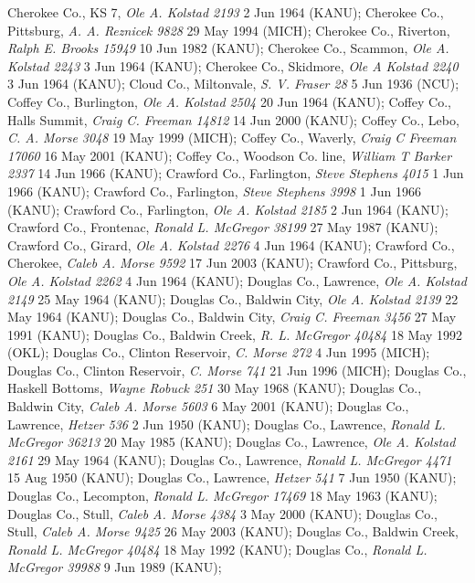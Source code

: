 \documentclass{article}
\begin{document}
Cherokee Co., KS 7, \textit{Ole A. Kolstad 2193} 2 Jun 1964 (KANU); 
Cherokee Co., Pittsburg, \textit{A. A. Reznicek 9828} 29 May 1994 (MICH); 
Cherokee Co., Riverton, \textit{Ralph E. Brooks 15949} 10 Jun 1982 (KANU); 
Cherokee Co., Scammon, \textit{Ole A. Kolstad 2243} 3 Jun 1964 (KANU); 
Cherokee Co., Skidmore, \textit{Ole A Kolstad 2240} 3 Jun 1964 (KANU); 
Cloud Co., Miltonvale, \textit{S. V. Fraser 28} 5 Jun 1936 (NCU); 
Coffey Co., Burlington, \textit{Ole A. Kolstad 2504} 20 Jun 1964 (KANU); 
Coffey Co., Halls Summit, \textit{Craig C. Freeman 14812} 14 Jun 2000 (KANU); 
Coffey Co., Lebo, \textit{C. A. Morse 3048} 19 May 1999 (MICH); 
Coffey Co., Waverly, \textit{Craig C Freeman 17060} 16 May 2001 (KANU); 
Coffey Co., Woodson Co. line, \textit{William T Barker 2337} 14 Jun 1966 (KANU); 
Crawford Co., Farlington, \textit{Steve Stephens 4015} 1 Jun 1966 (KANU); 
Crawford Co., Farlington, \textit{Steve Stephens 3998} 1 Jun 1966 (KANU); 
Crawford Co., Farlington, \textit{Ole A. Kolstad 2185} 2 Jun 1964 (KANU); 
Crawford Co., Frontenac, \textit{Ronald L. McGregor 38199} 27 May 1987 (KANU); 
Crawford Co., Girard, \textit{Ole A. Kolstad 2276} 4 Jun 1964 (KANU); 
Crawford Co., Cherokee, \textit{Caleb A. Morse 9592} 17 Jun 2003 (KANU); 
Crawford Co., Pittsburg, \textit{Ole A. Kolstad 2262} 4 Jun 1964 (KANU); 
Douglas Co., Lawrence, \textit{Ole A. Kolstad 2149} 25 May 1964 (KANU); 
Douglas Co., Baldwin City, \textit{Ole A. Kolstad 2139} 22 May 1964 (KANU); 
Douglas Co., Baldwin City, \textit{Craig C. Freeman 3456} 27 May 1991 (KANU); 
Douglas Co., Baldwin Creek, \textit{R. L. McGregor 40484} 18 May 1992 (OKL); 
Douglas Co., Clinton Reservoir, \textit{C. Morse 272} 4 Jun 1995 (MICH); 
Douglas Co., Clinton Reservoir, \textit{C. Morse 741} 21 Jun 1996 (MICH); 
Douglas Co., Haskell Bottoms, \textit{Wayne Robuck 251} 30 May 1968 (KANU); 
Douglas Co., Baldwin City, \textit{Caleb A. Morse 5603} 6 May 2001 (KANU); 
Douglas Co., Lawrence, \textit{Hetzer 536} 2 Jun 1950 (KANU); 
Douglas Co., Lawrence, \textit{Ronald L. McGregor 36213} 20 May 1985 (KANU); 
Douglas Co., Lawrence, \textit{Ole A. Kolstad 2161} 29 May 1964 (KANU); 
Douglas Co., Lawrence, \textit{Ronald L. McGregor 4471} 15 Aug 1950 (KANU); 
Douglas Co., Lawrence, \textit{Hetzer 541} 7 Jun 1950 (KANU); 
Douglas Co., Lecompton, \textit{Ronald L. McGregor 17469} 18 May 1963 (KANU); 
Douglas Co., Stull, \textit{Caleb A. Morse 4384} 3 May 2000 (KANU); 
Douglas Co., Stull, \textit{Caleb A. Morse 9425} 26 May 2003 (KANU); 
Douglas Co., Baldwin Creek, \textit{Ronald L. McGregor 40484} 18 May 1992 (KANU); 
Douglas Co., \textit{Ronald L. McGregor 39988} 9 Jun 1989 (KANU); 
\end{document}
